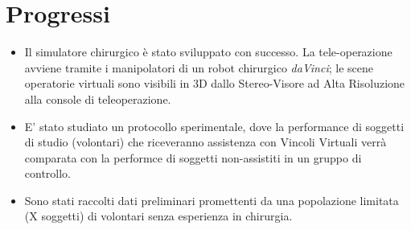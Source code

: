 \documentclass{article}
\begin{document}
\section{Progressi}
\begin{itemize}
  \item Il simulatore chirurgico è stato sviluppato con successo. La tele-operazione avviene tramite i manipolatori di un robot chirurgico \textit{daVinci}; le scene operatorie virtuali sono visibili in 3D dallo Stereo-Visore ad Alta Risoluzione alla console di teleoperazione.
  \item E' stato studiato un protocollo sperimentale, dove la performance di soggetti di studio (volontari) che riceveranno assistenza con Vincoli Virtuali verrà comparata con la performce di soggetti non-assistiti in un gruppo di controllo.
  \item Sono stati raccolti dati preliminari promettenti da una popolazione limitata (X soggetti) di volontari senza esperienza in chirurgia.  
\end{itemize}
\end{document}
